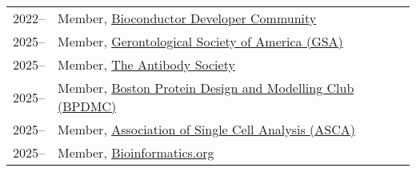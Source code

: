 \begin{longtable}[l]{@{}p{} p{}}

    2022-- & Member, \href{https://www.bioconductor.org/developers/}{Bioconductor Developer Community} \\

    2025-- & Member, \href{https://www.geron.org}{Gerontological Society of America (GSA)} \\

    2025-- & Member, \href{https://www.antibodysociety.org/}{The Antibody Society} \\

    2025-- & Member, \href{https://www.bpdmc.org/}{Boston Protein Design and Modelling Club (BPDMC)} \\

    2025-- & Member, \href{https://ascanet.org/}{Association of Single Cell Analysis (ASCA)} \\

    2025-- & Member, \href{https://www.bioinformatics.org/}{Bioinformatics.org} \\

\end{longtable}
